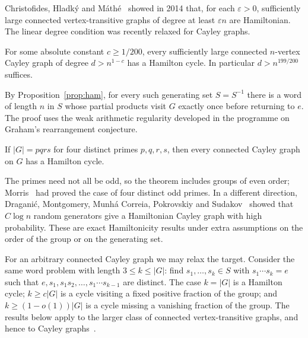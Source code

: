 
Christofides, Hladk\'y and M\'ath\'e~\cite{chm14} showed in 2014 that, for each $\varepsilon>0$, sufficiently large connected vertex-transitive graphs of degree at least $\varepsilon n$ are Hamiltonian. The linear degree condition was recently relaxed for Cayley graphs.

\begin{theorem}\label{thm:bdmp}
For some absolute constant $c\geq1/200$, every sufficiently large connected $n$-vertex Cayley graph of degree $d>n^{1-c}$ has a Hamilton cycle. In particular $d>n^{199/200}$ suffices.
\end{theorem}

By Proposition~\ref{prop:ham}, for every such generating set $S=S^{-1}$ there is a word of length $n$ in $S$ whose partial products visit $G$ exactly once before returning to $e$. The proof uses the weak arithmetic regularity developed in the programme on Graham's rearrangement conjecture.

\begin{theorem}\label{thm:pqrs}
If $|G|=pqrs$ for four distinct primes $p,q,r,s$, then every connected Cayley graph on $G$ has a Hamilton cycle.
\end{theorem}

The primes need not all be odd, so the theorem includes groups of even order; Morris~\cite{mor21} had proved the case of four distinct odd primes. In a different direction, Dragani\'c, Montgomery, Munh\'a Correia, Pokrovskiy and Sudakov~\cite{dmmps24} showed that $C\log n$ random generators give a Hamiltonian Cayley graph with high probability. These are exact Hamiltonicity results under extra assumptions on the order of the group or on the generating set.


For an arbitrary connected Cayley graph we may relax the target. Consider the same word problem with length $3\leq k\leq|G|$: find $s_1,\dots,s_k\in S$ with $s_1\cdots s_k=e$ such that $e,s_1,s_1s_2,\dots,s_1\cdots s_{k-1}$ are distinct. The case $k=|G|$ is a Hamilton cycle; $k\geq c|G|$ is a cycle visiting a fixed positive fraction of the group; and $k\geq(1-o(1))|G|$ is a cycle missing a vanishing fraction of the group. The results below apply to the larger class of connected vertex-transitive graphs, and hence to Cayley graphs~\cite[\S1]{mz26}.

